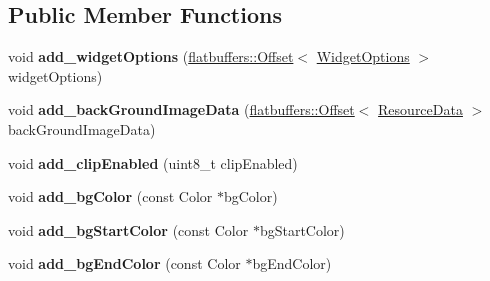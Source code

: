 \subsection*{Public Member Functions}
\begin{DoxyCompactItemize}
\item 
\mbox{\label{structflatbuffers_1_1ScrollViewOptionsBuilder_a35afa144a29f048ccb6eaab7c60e227d}} 
void {\bfseries add\+\_\+widget\+Options} (\hyperlink{structflatbuffers_1_1Offset}{flatbuffers\+::\+Offset}$<$ \hyperlink{structflatbuffers_1_1WidgetOptions}{Widget\+Options} $>$ widget\+Options)
\item 
\mbox{\label{structflatbuffers_1_1ScrollViewOptionsBuilder_aa4493adfb8b68db449d27800aa417de3}} 
void {\bfseries add\+\_\+back\+Ground\+Image\+Data} (\hyperlink{structflatbuffers_1_1Offset}{flatbuffers\+::\+Offset}$<$ \hyperlink{structflatbuffers_1_1ResourceData}{Resource\+Data} $>$ back\+Ground\+Image\+Data)
\item 
\mbox{\label{structflatbuffers_1_1ScrollViewOptionsBuilder_aaed82d7ddcfaae88a3fbd7fa9e99d836}} 
void {\bfseries add\+\_\+clip\+Enabled} (uint8\+\_\+t clip\+Enabled)
\item 
\mbox{\label{structflatbuffers_1_1ScrollViewOptionsBuilder_a49082612098dfe832280e5c1892c6307}} 
void {\bfseries add\+\_\+bg\+Color} (const Color $\ast$bg\+Color)
\item 
\mbox{\label{structflatbuffers_1_1ScrollViewOptionsBuilder_a9286b530abd56e6e50ce6fbee1ebca0a}} 
void {\bfseries add\+\_\+bg\+Start\+Color} (const Color $\ast$bg\+Start\+Color)
\item 
\mbox{\label{structflatbuffers_1_1ScrollViewOptionsBuilder_a7f89c6b73843f8d35f69cb02e6beebf7}} 
void {\bfseries add\+\_\+bg\+End\+Color} (const Color $\ast$bg\+End\+Color)
\item 
\mbox{\label{structflatbuffers_1_1ScrollViewOptionsBuilder_a092191b7f38fa9df3b26e9bbc9d6ae3d}} 

\end{DoxyCompactItemize}
